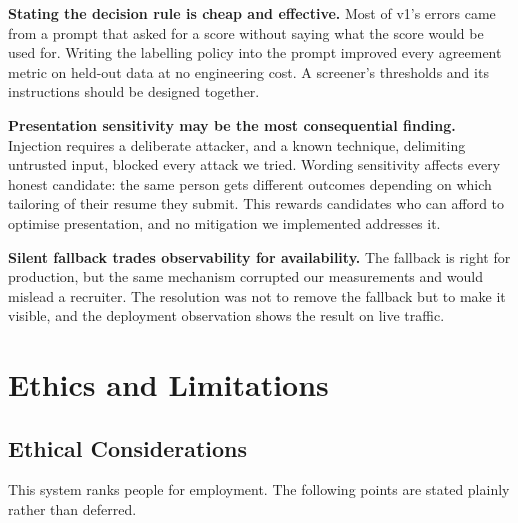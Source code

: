 \documentclass[conference]{IEEEtran}
\begin{document}
\textbf{Stating the decision rule is cheap and effective.} Most of v1's errors
came from a prompt that asked for a score without saying what the score would be
used for. Writing the labelling policy into the prompt improved every agreement
metric on held-out data at no engineering cost. A screener's thresholds and its
instructions should be designed together.

\textbf{Presentation sensitivity may be the most consequential finding.}
Injection requires a deliberate attacker, and a known technique, delimiting
untrusted input, blocked every attack we tried. Wording sensitivity affects
every honest candidate: the same person gets different outcomes depending on
which tailoring of their resume they submit. This rewards candidates who can
afford to optimise presentation, and no mitigation we implemented addresses it.

\textbf{Silent fallback trades observability for availability.} The fallback is
right for production, but the same mechanism corrupted our measurements and
would mislead a recruiter. The resolution was not to remove the fallback but to
make it visible, and the deployment observation shows the result on live
traffic.

\section{Ethics and Limitations}
\label{sec:ethics}

\subsection{Ethical Considerations}

This system ranks people for employment. The following points are stated
plainly rather than deferred.
\end{document}
